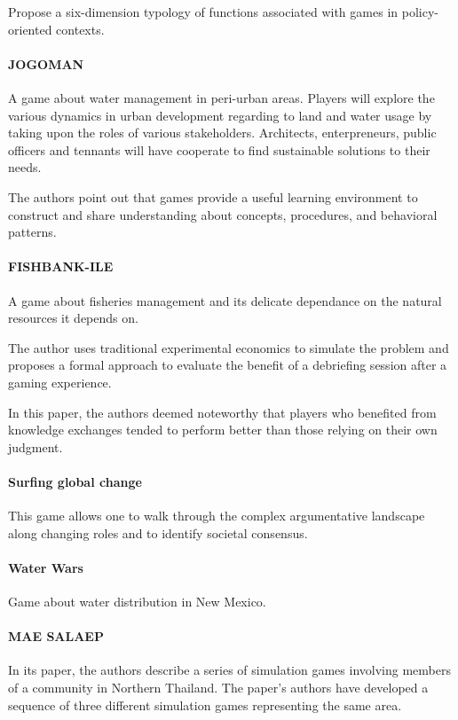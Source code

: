 Propose a six-dimension typology of functions associated with games in policy-oriented contexts.

\paragraph{JOGOMAN
\cite{Camargo2007}}
A game about water management in peri-urban areas. Players will explore the
various dynamics in urban development regarding to land and water usage by
taking upon the roles of various stakeholders. Architects, enterpreneurs,
public officers and tennants will have cooperate to find sustainable solutions
to their needs.

The authors point out that games provide a useful
learning environment to construct and share understanding about concepts,
procedures, and behavioral patterns.

\paragraph{FISHBANK-ILE
\cite{Qudrat-Ullah1997}}
A game about fisheries management and its delicate dependance on the natural
resources it depends on.

The author uses traditional experimental economics to simulate the problem
and proposes a formal approach to evaluate the benefit of a debriefing session after a
gaming experience.

In this paper, the authors deemed noteworthy that players who benefited
from knowledge exchanges tended to perform better than those
relying on their own judgment.

\paragraph{Surfing global change
\cite{Ahamer2006}}
This game allows one to walk through the complex argumentative landscape along changing roles and to identify societal consensus.

\paragraph{Water Wars
\cite{Hirsch2010}}
Game about water distribution in New Mexico.

\paragraph{MAE SALAEP
\cite{Barnaud2007}}
In its paper, the authors describe a series of simulation games involving
members of a community in Northern Thailand.
The paper's authors have developed a sequence of three different simulation
games representing the same area.

